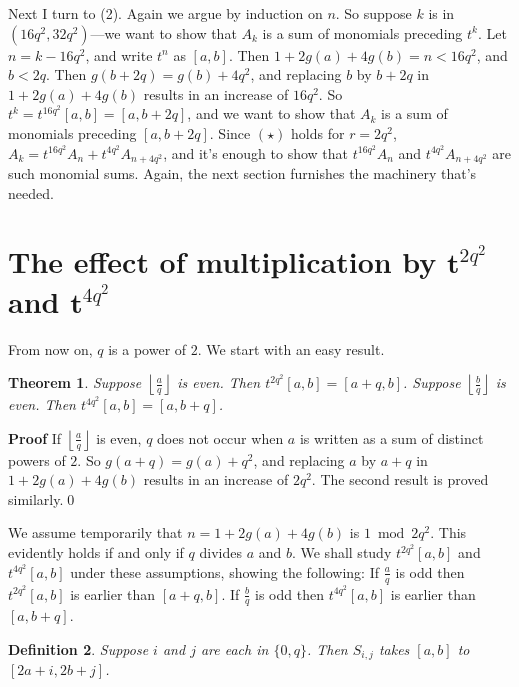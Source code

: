 \documentclass{monsky2009}
\newenvironment{proof}[1][]{\textbf{Proof #1\hspace{.3em}}}{}
\newtheorem{definition}{Definition}[section]
\newtheorem{theorem}[definition]{Theorem}
\begin{document}
Next I turn to (2). Again we argue by induction on $n$. So suppose $k$ is in $(16q^{2},32q^{2})$---we want to show that $A_{k}$ is a sum of monomials preceding $t^{k}$.  Let $n=k-16q^{2}$, and write $t^{n}$ as $[a,b]$. Then $1+2g(a)+4g(b)=n<16q^{2}$, and $b<2q$. Then $g(b+2q) = g(b) +4q^{2}$, and replacing $b$ by $b+2q$ in $1+2g(a)+4g(b)$ results in an increase of $16q^{2}$. So $t^{k} =t^{16q^{2}}[a,b]=[a, b+2q]$, and we want to show that $A_{k}$ is a sum of monomials preceding $[a, b+2q]$. Since $(\star)$ holds for $r=2q^{2}$, $A_{k}=t^{16q^{2}}A_{n}+t^{4q^{2}}A_{n+4q^{2}}$, and it's enough to show that $t^{16q^{2}}A_{n}$ and $t^{4q^{2}}A_{n+4q^{2}}$ are such monomial sums. Again, the next section furnishes the machinery that's needed.


\section{The effect of multiplication by $\bm t^{2q^{2}}$ and $\bm t^{4q^{2}}$}
\label{section2}

From now on, $q$ is a power of $2$. We start with an easy result.

\begin{theorem}%
\label{theorem2.1}
Suppose $\left\lfloor\frac{a}{q}\right\rfloor$ is even. Then $t^{2q^{2}}[a,b]=[a+q,b]$. Suppose $\left\lfloor\frac{b}{q}\right\rfloor$ is even. Then $t^{4q^{2}}[a,b]=[a,b+q]$. 
\end{theorem}

\begin{proof}
If $\left\lfloor\frac{a}{q}\right\rfloor$ is even, $q$ does not occur when $a$ is written as a sum of distinct powers of $2$. So $g(a+q)=g(a)+q^{2}$, and replacing $a$ by $a+q$ in $1+2g(a)+4g(b)$ results in an increase of $2q^{2}$. The second result is proved similarly.\qed
\end{proof}

We assume temporarily that $n=1+2g(a)+4g(b)$ is $1 \bmod{2q^{2}}$. This evidently holds if and only if $q$ divides $a$ and $b$. We shall study $t^{2q^{2}}[a,b]$ and $t^{4q^{2}}[a,b]$ under these assumptions, showing the following: If $\frac{a}{q}$ is odd then $t^{2q^{2}}[a,b]$ is earlier than $[a+q,b]$. If $\frac{b}{q}$ is odd then $t^{4q^{2}}[a,b]$ is earlier than $[a,b+q]$.  

\begin{definition}
\label{def2.2}
Suppose $i$ and $j$ are each in $\{0,q\}$. Then $S_{i,j}$ takes $[a,b]$ to $[2a+i, 2b+j]$.
\end{definition}
\end{document}
